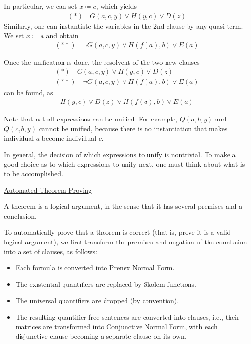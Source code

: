 \documentclass{article}
\begin{document}
In particular, we can set $x \coloneqq c$, which yields
\begin{align*}
(*) \quad G(a,c,y) \vee H(y,c) \vee D(z)
\end{align*}
Similarly, one can instantiate the variables in the $2$nd clause by any quasi-term. We set $x \coloneqq a$ and obtain
\begin{align*}
(**) \quad \neg G(a,c,y) \vee H(f(a),b) \vee E(a)
\end{align*}

Once the unification is done, the resolvent of the two new clauses
\begin{align*}
(*) \quad G(a,c,y) \vee H(y,c) \vee D(z) \\
(**) \quad \neg G(a,c,y) \vee H(f(a),b) \vee E(a)
\end{align*}
can be found, as 
\begin{align*}
H(y,c) \vee D(z) \vee H(f(a), b) \vee E(a)
\end{align*}

Note that not all expressions can be unified. For example, $Q(a,b,y)$ and $Q(c,b,y)$ cannot be unified, because there is no instantiation that makes individual $a$ become individual $c$. 

In general, the decision of which expressions to unify is nontrivial. To make a good choice as to which expressions to unify next, one must think about what is to be accomplished.

\underline{Automated Theorem Proving}

A theorem is a logical argument, in the sense that it has several premises and a conclusion.

To automatically prove that a theorem is correct (that is, prove it is a valid logical argument), we first transform the premises and negation of the conclusion into a set of clauses, as follows:
\begin{itemize}
    \item Each formula is converted into Prenex Normal Form.
    \item The existential quantifiers are replaced by Skolem functions.
    \item The universal quantifiers are dropped (by convention).
    \item The resulting quantifier-free sentences are converted into clauses, i.e., their matrices are transformed into Conjunctive Normal Form, with each disjunctive clause becoming a separate clause on its own. 
\end{itemize}
\end{document}
